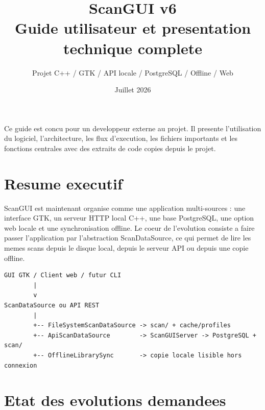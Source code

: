\documentclass[11pt,a4paper]{article}
\title{\textcolor{sgblue}{\Huge ScanGUI v6}\\[0.3em]\Large Guide utilisateur et presentation technique complete}
\author{Projet C++ / GTK / API locale / PostgreSQL / Offline / Web}
\date{Juillet 2026}
\begin{document}
\maketitle
\begin{infobox}
Ce guide est concu pour un developpeur externe au projet. Il presente l'utilisation du logiciel, l'architecture, les flux d'execution, les fichiers importants et les fonctions centrales avec des extraits de code copies depuis le projet.
\end{infobox}
\tableofcontents
\newpage
\section{Resume executif}
ScanGUI est maintenant organise comme une application multi-sources : une interface GTK, un serveur HTTP local C++, une base PostgreSQL, une option web locale et une synchronisation offline. Le coeur de l'evolution consiste a faire passer l'application par l'abstraction ScanDataSource, ce qui permet de lire les memes scans depuis le disque local, depuis le serveur API ou depuis une copie offline.


\begin{infobox}
\begin{verbatim}
GUI GTK / Client web / futur CLI
        |
        v
ScanDataSource ou API REST
        |
        +-- FileSystemScanDataSource -> scan/ + cache/profiles
        +-- ApiScanDataSource        -> ScanGUIServer -> PostgreSQL + scan/
        +-- OfflineLibrarySync       -> copie locale lisible hors connexion
\end{verbatim}
\end{infobox}
\section{Etat des evolutions demandees}
\end{document}
